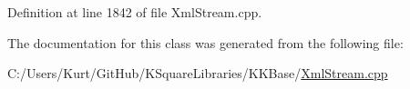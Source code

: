 Definition at line 1842 of file Xml\+Stream.\+cpp.



The documentation for this class was generated from the following file\+:\begin{DoxyCompactItemize}
\item 
C\+:/\+Users/\+Kurt/\+Git\+Hub/\+K\+Square\+Libraries/\+K\+K\+Base/\hyperlink{_xml_stream_8cpp}{Xml\+Stream.\+cpp}\end{DoxyCompactItemize}
